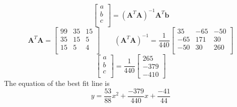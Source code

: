 \documentclass{article}
\begin{document}
$$
\begin{bmatrix}
a \\
b \\
c \\
\end{bmatrix}
=(\mathbf{A}^T\mathbf{A})^{-1}\mathbf{A}^T\mathbf{b}
$$
$$
\mathbf{A}^T\mathbf{A}
=
\begin{bmatrix}
99 & 35 & 15 \\
35 & 15 &  5 \\
15 &  5 &  4 \\
\end{bmatrix}
\qquad
(\mathbf{A}^T\mathbf{A})^{-1}
=
\frac{1}{440}
\begin{bmatrix}
 35 & -65 & -50 \\
-65 & 171 &  30 \\
-50 &  30 & 260 \\
\end{bmatrix}
$$
$$
\begin{bmatrix}
a \\
b \\
c \\
\end{bmatrix}
=
\frac{1}{440}
\begin{bmatrix}
 265 \\
-379 \\
-410
\end{bmatrix}
$$
The equation of the best fit line is
$$ y = \frac{53}{88}x^2 + \frac{-379}{440}x + \frac{-41}{44} $$
\end{document}

